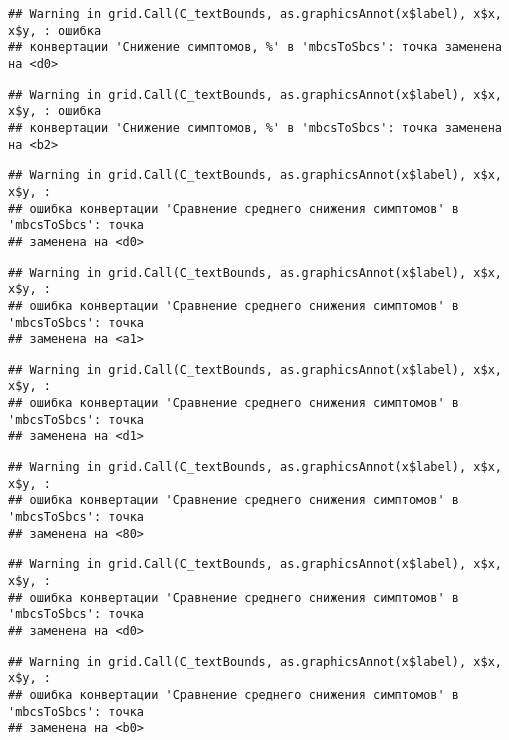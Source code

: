 \documentclass[
]{article}
\begin{document}
\begin{verbatim}
## Warning in grid.Call(C_textBounds, as.graphicsAnnot(x$label), x$x, x$y, : ошибка
## конвертации 'Снижение симптомов, %' в 'mbcsToSbcs': точка заменена на <d0>
\end{verbatim}

\begin{verbatim}
## Warning in grid.Call(C_textBounds, as.graphicsAnnot(x$label), x$x, x$y, : ошибка
## конвертации 'Снижение симптомов, %' в 'mbcsToSbcs': точка заменена на <b2>
\end{verbatim}

\begin{verbatim}
## Warning in grid.Call(C_textBounds, as.graphicsAnnot(x$label), x$x, x$y, :
## ошибка конвертации 'Сравнение среднего снижения симптомов' в 'mbcsToSbcs': точка
## заменена на <d0>
\end{verbatim}

\begin{verbatim}
## Warning in grid.Call(C_textBounds, as.graphicsAnnot(x$label), x$x, x$y, :
## ошибка конвертации 'Сравнение среднего снижения симптомов' в 'mbcsToSbcs': точка
## заменена на <a1>
\end{verbatim}

\begin{verbatim}
## Warning in grid.Call(C_textBounds, as.graphicsAnnot(x$label), x$x, x$y, :
## ошибка конвертации 'Сравнение среднего снижения симптомов' в 'mbcsToSbcs': точка
## заменена на <d1>
\end{verbatim}

\begin{verbatim}
## Warning in grid.Call(C_textBounds, as.graphicsAnnot(x$label), x$x, x$y, :
## ошибка конвертации 'Сравнение среднего снижения симптомов' в 'mbcsToSbcs': точка
## заменена на <80>
\end{verbatim}

\begin{verbatim}
## Warning in grid.Call(C_textBounds, as.graphicsAnnot(x$label), x$x, x$y, :
## ошибка конвертации 'Сравнение среднего снижения симптомов' в 'mbcsToSbcs': точка
## заменена на <d0>
\end{verbatim}

\begin{verbatim}
## Warning in grid.Call(C_textBounds, as.graphicsAnnot(x$label), x$x, x$y, :
## ошибка конвертации 'Сравнение среднего снижения симптомов' в 'mbcsToSbcs': точка
## заменена на <b0>
\end{verbatim}
\end{document}
